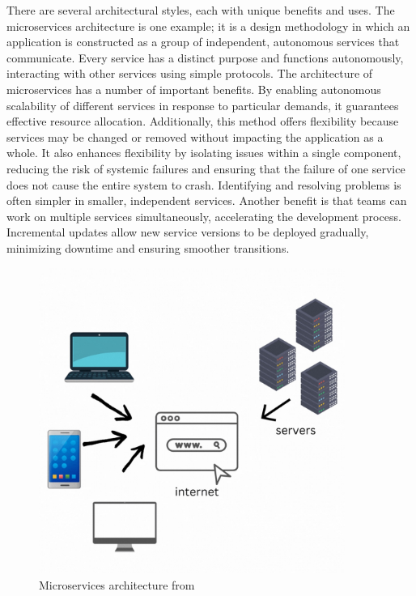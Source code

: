     There are several architectural styles, each with unique benefits and uses. The microservices architecture is one example; it is a design methodology in which an application is constructed as a group of independent, autonomous services that communicate. Every service has a distinct purpose and functions autonomously, interacting with other services using simple protocols. The architecture of microservices has a number of important benefits. By enabling autonomous scalability of different services in response to particular demands, it guarantees effective resource allocation. Additionally, this method offers flexibility because services may be changed or removed without impacting the application as a whole. It also enhances flexibility by isolating issues within a single component, reducing the risk of systemic failures and ensuring that the failure of one service does not cause the entire system to crash. Identifying and resolving problems is often simpler in smaller, independent services. Another benefit is that teams can work on multiple services simultaneously, accelerating the development process. Incremental updates allow new service versions to be deployed gradually, minimizing downtime and ensuring smoother transitions.
    \cite{Vicki}
    \begin{figure}[H]
        \centering
        \includegraphics[width=10cm]{chapters/2/figures/eb6b7a926564d8e2d83f58f00.jpg}
        \caption[Microservices architecture]{Microservices architecture  from~\cite{Vicki}}
        \label{fig:microservices-architecture}
    \end{figure}
    
